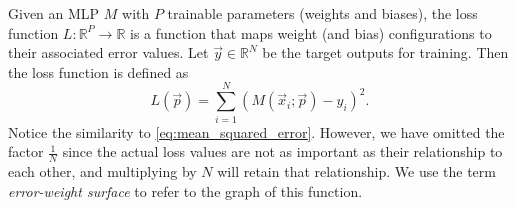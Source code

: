 \begin{definition}
    Given an MLP $M$ with $P$ trainable parameters (weights and biases), the loss function $L:\mathbb{R}^P\rightarrow \mathbb{R}$ is a function that maps weight (and bias) configurations to their associated error values.
    Let $\vec{y} \in \mathbb{R}^N$ be the target outputs for training.
    Then the loss function is defined as
    \begin{equation}
        L(\vec{p}) = \sum_{i=1}^N{\left(M\left(\vec{x}_i; \vec{p}\right) - y_i\right)^2}.
    \end{equation}
    Notice the similarity to \ref{eq:mean_squared_error}. 
    However, we have omitted the factor $\frac{1}{N}$ since the actual loss values are not as important as their relationship to each other, and multiplying by $N$ will retain that relationship.
    We use the term \textit{error-weight surface} to refer to the graph of this function.
\end{definition}

